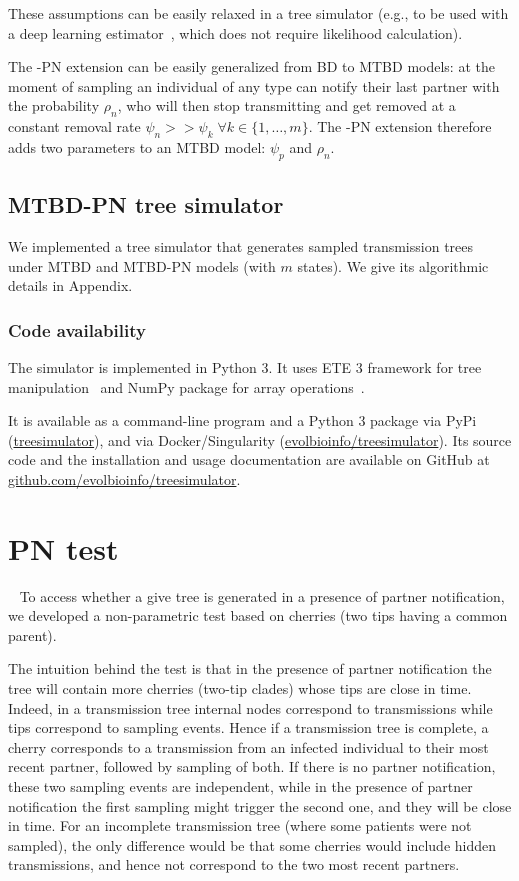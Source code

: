 \documentclass[a4paper,10pt]{article}
\begin{document}
These assumptions can be easily relaxed in a tree simulator (e.g., to be used with a deep learning estimator~\citep{Voznica2021}, which does not require likelihood calculation).


The -PN extension can be easily generalized from BD to MTBD models: at the moment of sampling an individual of any type can notify their last partner with the probability $\rho_n$, who will then stop transmitting and get removed at a constant removal rate $\psi_n >> \psi_k \; \forall k \in \{1, \ldots, m\}$. The -PN extension therefore adds two parameters to an MTBD model: $\psi_p$ and $\rho_n$.

\subsection{MTBD-PN tree simulator}

We implemented a tree simulator that generates sampled transmission trees under MTBD and MTBD-PN models (with $m$ states). We give its algorithmic details in Appendix. 

\subsubsection*{Code availability}
The simulator is implemented in Python 3. It uses ETE 3 framework for tree manipulation~\citep{Huerta-Cepas2016} and NumPy package for array operations~\citep{harris_array_2020}. 

It is available as a command-line program and a Python 3 package via PyPi (\href{https://pypi.org/project/treesimulator}{treesimulator}), and via Docker/Singularity (\href{https://hub.docker.com/r/evolbioinfo/treesimulator/tags}{evolbioinfo/treesimulator}). Its source code and the installation and usage documentation are available on GitHub at \href{https://github.com/evolbioinfo/treesimulator}{github.com/evolbioinfo/treesimulator}.



\section{PN test}~\label{sec:test}
To access whether a give tree is generated in a presence of partner notification, we developed a non-parametric test based on cherries (two tips having a common parent). 

The intuition behind the test is that in the presence of partner notification the tree will contain more cherries (two-tip clades) whose tips are close in time. Indeed, in a transmission tree internal nodes correspond to transmissions while tips correspond to sampling events. Hence if a transmission tree is complete, a cherry corresponds to a transmission from an infected individual to their most recent partner, followed by sampling of both. If there is no partner notification, these two sampling events are independent, while in the presence of partner notification the first sampling might trigger the second one, and they will be close in time. For an incomplete transmission tree (where some patients were not sampled), the only difference would be that some cherries would include hidden transmissions, and hence not correspond to the two most recent partners.
\end{document}
